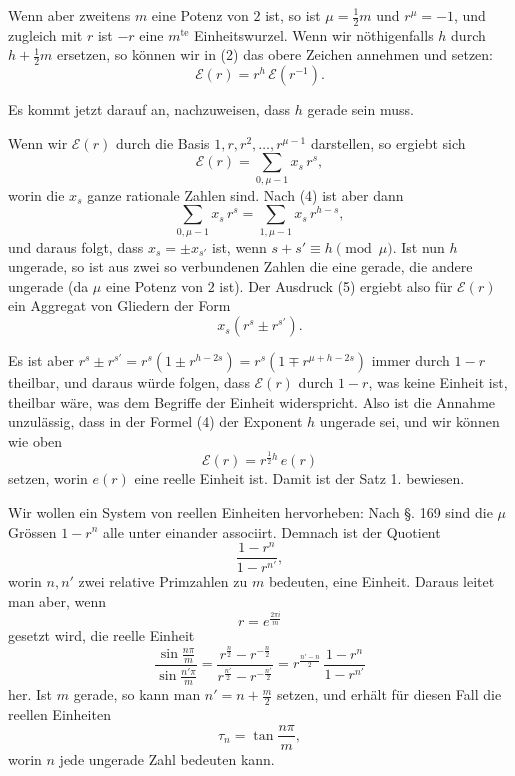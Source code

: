 \documentclass[12pt,a4paper]{article}
\newcommand{\tang}{\tan}
\begin{document}
Wenn aber zweitens $m$ eine Potenz von $2$ ist, so ist $\mu = \frac{1}{2}m$ und $r^\mu = -1$, und zugleich mit $r$ ist $-r$ eine $m^{\text{te}}$ Einheitswurzel. Wenn wir nöthigenfalls $h$ durch $h + \frac{1}{2}m$ ersetzen, so können wir in (2) das obere Zeichen annehmen und setzen:
\begin{equation}\label{eq:178-4}
\mathcal{E}(r) = r^h\, \mathcal{E}(r^{-1}).
\end{equation}

Es kommt jetzt darauf an, nachzuweisen, dass $h$ gerade sein muss.

Wenn wir $\mathcal{E}(r)$ durch die Basis $1, r, r^2, \ldots, r^{\mu-1}$ darstellen, so ergiebt sich
\begin{equation}\label{eq:178-5}
\mathcal{E}(r) = \sum_{0,\mu-1} x_s\, r^s,
\end{equation}
worin die $x_s$ ganze rationale Zahlen sind. Nach (4) ist aber dann
\[
\sum_{0,\mu-1} x_s\, r^s = \sum_{1,\mu-1} x_s\, r^{h-s},
\]
und daraus folgt, dass $x_s = \pm x_{s'}$ ist, wenn $s + s' \equiv h \pmod{\mu}$. Ist nun $h$ ungerade, so ist aus zwei so verbundenen Zahlen die eine gerade, die andere ungerade (da $\mu$ eine Potenz von $2$ ist). Der Ausdruck (5) ergiebt also für $\mathcal{E}(r)$ ein Aggregat von Gliedern der Form
\[
x_s(r^s \pm r^{s'}).
\]

Es ist aber $r^s \pm r^{s'} = r^s(1 \pm r^{h-2s}) = r^s(1 \mp r^{\mu+h-2s})$ immer durch $1 - r$ theilbar, und daraus würde folgen, dass $\mathcal{E}(r)$ durch $1 - r$, was keine Einheit ist, theilbar wäre, was dem Begriffe der Einheit widerspricht. Also ist die Annahme unzulässig, dass in der Formel (4) der Exponent $h$ ungerade sei, und wir können wie oben
\[
\mathcal{E}(r) = r^{\frac{1}{2}h}\, e(r)
\]
setzen, worin $e(r)$ eine reelle Einheit ist. Damit ist der Satz 1. bewiesen.

Wir wollen ein System von reellen Einheiten hervorheben: Nach \S. 169 sind die $\mu$ Grössen $1 - r^n$ alle unter einander associirt. Demnach ist der Quotient
\[
\frac{1 - r^n}{1 - r^{n'}},
\]
worin $n, n'$ zwei relative Primzahlen zu $m$ bedeuten, eine Einheit. Daraus leitet man aber, wenn
\[
r = e^{\frac{2\pi i}{m}}
\]
gesetzt wird, die reelle Einheit
\begin{equation}\label{eq:178-6}
\frac{\sin\frac{n\pi}{m}}{\sin\frac{n'\pi}{m}} = \frac{r^{\frac{n}{2}} - r^{-\frac{n}{2}}}{r^{\frac{n'}{2}} - r^{-\frac{n'}{2}}} = r^{\frac{n'-n}{2}}\,\frac{1 - r^n}{1 - r^{n'}}
\end{equation}
her. Ist $m$ gerade, so kann man $n' = n + \frac{m}{2}$ setzen, und erhält für diesen Fall die reellen Einheiten
\begin{equation}\label{eq:178-7}
\tau_n = \tang\frac{n\pi}{m},
\end{equation}
worin $n$ jede ungerade Zahl bedeuten kann.
\end{document}
